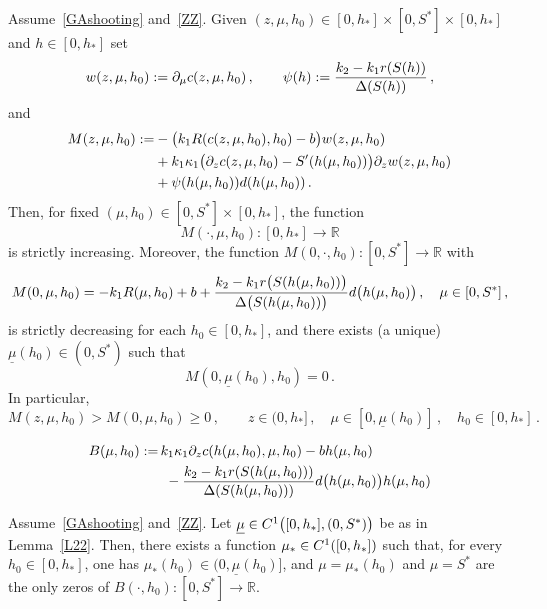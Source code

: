 \documentclass[10pt,a4paper]{amsart}
\newcommand{\R}{\mathbb{R}}
\begin{document}
\begin{lem}\label{L22}
Assume~\eqref{GAshooting} and~\eqref{ZZ}.  Given $(z,\mu,h_0)\in [0,h_*]\times [0,S^*]\times [0,h_*]$ and $h\in [0,h_*]$ set
\[
w(z,\mu,h_0):=\partial_\mu{\rm c}(z,\mu,h_0)\,,\qquad
\psi(h):=\frac{k_2-k_1{\rm r}(S(h))}{\Delta(S(h))}\,,
\]
and
\begin{equation}\label{Mdef}
\begin{aligned}
M(z,\mu,h_0):=&-\big(k_1 R({\rm c}(z,\mu,h_0),h_0)-b\big)w(z,\mu,h_0)\\
&+k_1\kappa_1\big(\partial_z{\rm c}(z,\mu,h_0)-S'(h(\mu,h_0))\big)\partial_z w(z,\mu,h_0)\\
&+\psi(h(\mu,h_0))d(h(\mu,h_0))\,.
\end{aligned}
\end{equation}
Then, for fixed $(\mu,h_0)\in [0,S^*]\times [0,h_*]$, the function
$$
M(\cdot,\mu,h_0):[0,h_*]\to \R
$$ 
is strictly increasing. Moreover, the function
$M(0,\cdot,h_0):[0,S^*]\to\R$ with
\begin{equation}\label{M0}
M(0,\mu,h_0)=- k_1 R(\mu,h_0)+b +\frac{k_2-k_1{\rm r}\big(S(h(\mu,h_0))\big)}{\Delta\big(S(h(\mu,h_0))\big)}d\big(h(\mu,h_0)\big)\,,\quad \mu\in [0,S^*]\,,
\end{equation}
is strictly decreasing for each $h_0\in [0,h_*]$, and there exists (a unique) $\underline{\mu}(h_0)\in (0,S^*)$ such that 
$$
M(0,\underline{\mu}(h_0),h_0)=0\,.
$$ 
In particular,
\begin{equation}\label{M}
M(z,\mu,h_0)> M(0,\mu,h_0)\ge 0\,,\qquad z\in (0,h_*]\,,\quad \mu\in [0,\underline{\mu}(h_0)]\,,\quad h_0\in [0,h_*] \,.
\end{equation}
\end{lem}

\begin{equation}\label{400}
\begin{split}
B(\mu,h_0):=\, & k_1\kappa_1 \partial_z {\rm c}(h(\mu,h_0),\mu,h_0)-bh(\mu,h_0)\\
&\ -\frac{k_2-k_1 {\rm r}(S(h(\mu,h_0)))}{\Delta(S(h(\mu,h_0)))}d\big(h(\mu,h_0)\big)h(\mu,h_0)
\end{split}
\end{equation}

\begin{lem}\label{L40}
Assume~\eqref{GAshooting} and~\eqref{ZZ}. Let  $\underline{\mu}\in {\rm C}^1\big([0,h_*], (0,S^*)\big)$ be as in Lemma~\ref{L22}. Then, there exists a function $\mu_*\in {\rm C}^1([0,h_*])$ such that, for every
$h_0\in[0,h_*]$, one has $\mu_*(h_0)\in(0,\underline{\mu}(h_0)]$, and
$\mu=\mu_*(h_0)$ and $\mu=S^*$ are the only zeros of
$B(\cdot,h_0):[0,S^*]\to\R$.
\end{lem}
\end{document}
